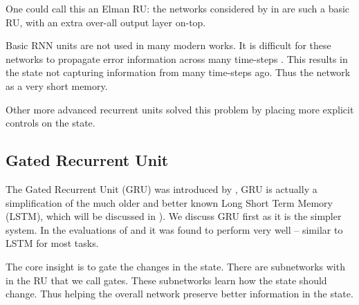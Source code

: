 \documentclass[12pt,parskip]{komatufte}
\begin{document}
One could call this an Elman RU:
the networks considered by in  are such a basic RU, with an extra over-all output layer on-top.

Basic RNN units are not used in many modern works.
It is difficult for these networks to propagate error information across many time-steps .
This results in the state not capturing information from many time-steps ago.
Thus the network as a very short memory.

Other more advanced recurrent units solved this problem by placing more explicit controls on the state.

\subsection{Gated Recurrent Unit}
The Gated Recurrent Unit (GRU) was introduced by ,
GRU is actually a simplification of the much older and better known Long Short Term Memory (LSTM),
which will be discussed in ).
We discuss GRU first as it is the simpler system.
In the evaluations of  and  it was found to perform very well -- similar to LSTM for most tasks.

The core insight is to gate the changes in the state.
There are subnetworks with in the RU that we call gates.
These subnetworks learn how the state should change.
Thus helping the overall network preserve better information in the state.
\end{document}
